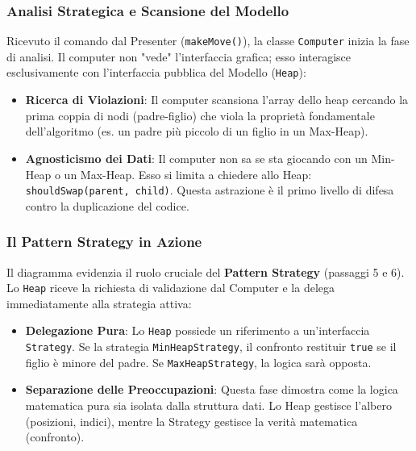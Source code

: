 \documentclass[openany]{theme/uniprthesis}
\begin{document}
\subsubsection{Analisi Strategica e Scansione del Modello}
Ricevuto il comando dal Presenter (\texttt{makeMove()}), la classe \texttt{Computer} inizia la fase di analisi. Il computer non "vede" l'interfaccia grafica; esso interagisce esclusivamente con l'interfaccia pubblica del Modello (\texttt{Heap}):
\begin{itemize}
    \item \textbf{Ricerca di Violazioni}: Il computer scansiona l'array dello heap cercando la prima coppia di nodi (padre-figlio) che viola la proprietà fondamentale dell'algoritmo (es. un padre più piccolo di un figlio in un Max-Heap).
    \item \textbf{Agnosticismo dei Dati}: Il computer non sa se sta giocando con un Min-Heap o un Max-Heap. Esso si limita a chiedere allo Heap: \texttt{shouldSwap(parent, child)}. Questa astrazione è il primo livello di difesa contro la duplicazione del codice.
\end{itemize}

\subsubsection{Il Pattern Strategy in Azione}
Il diagramma evidenzia il ruolo cruciale del \textbf{Pattern Strategy} (passaggi 5 e 6). Lo \texttt{Heap} riceve la richiesta di validazione dal Computer e la delega immediatamente alla strategia attiva:
\begin{itemize}
    \item \textbf{Delegazione Pura}: Lo \texttt{Heap} possiede un riferimento a un'interfaccia \texttt{Strategy}. Se la strategia  \texttt{MinHeapStrategy}, il confronto restituir  \texttt{true} se il figlio è minore del padre. Se  \texttt{MaxHeapStrategy}, la logica sarà opposta.
    \item \textbf{Separazione delle Preoccupazioni}: Questa fase dimostra come la logica matematica pura sia isolata dalla struttura dati. Lo Heap gestisce l'albero (posizioni, indici), mentre la Strategy gestisce la verità matematica (confronto).
\end{itemize}

\end{document}
